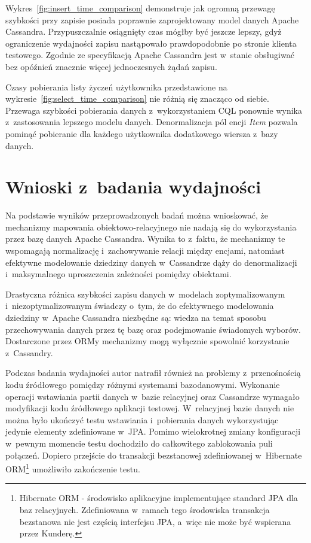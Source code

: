 Wykres~\ref{fig:insert_time_comparison} demonstruje jak ogromną przewagę szybkości przy zapisie posiada poprawnie zaprojektowany model danych Apache Cassandra. Przypuszczalnie osiągnięty czas mógłby być jeszcze lepszy, gdyż ograniczenie wydajności zapisu nastąpowało prawdopodobnie po stronie klienta testowego. Zgodnie ze specyfikacją Apache Cassandra jest w~stanie obsługiwać bez opóźnień znacznie więcej jednoczesnych żądań zapisu.

Czasy pobierania listy życzeń użytkownika przedstawione na wykresie~\ref{fig:select_time_comparison} nie różnią się znacząco od siebie. Przewaga szybkości pobierania danych z~wykorzystaniem CQL ponownie wynika z~zastosowania lepszego modelu danych. Denormalizacja pól encji \emph{Item} pozwala pominąć pobieranie dla każdego użytkownika dodatkowego wiersza z~bazy danych. 

\section{Wnioski z~badania wydajności}
\label{sec:cassandra_orm_performance_summary}

Na podstawie wyników przeprowadzonych badań można wnioskować, że mechanizmy mapowania obiektowo-relacyjnego nie nadają się do wykorzystania przez bazę danych Apache Cassandra. Wynika to z~faktu, że mechanizmy te wspomagają normalizację i~zachowywanie relacji między encjami, natomiast efektywne modelowanie dziedziny danych w~Cassandrze dąży do denormalizacji i~maksymalnego uproszczenia zależności pomiędzy obiektami.

Drastyczna różnica szybkości zapisu danych w~modelach zoptymalizowanym i~niezoptymalizowanym świadczy o~tym, że do efektywnego modelowania dziedziny w~Apache Cassandra niezbędne są: wiedza na temat sposobu przechowywania danych przez tę bazę oraz podejmowanie świadomych wyborów. Dostarczone przez ORMy mechanizmy mogą wyłącznie spowolnić korzystanie z~Cassandry.

Podczas badania wydajności autor natrafił również na problemy z~przenośnością kodu źródłowego pomiędzy różnymi systemami bazodanowymi. Wykonanie operacji wstawiania partii danych w~bazie relacyjnej oraz Cassandrze wymagało modyfikacji kodu źródłowego aplikacji testowej. W~relacyjnej bazie danych nie można było ukończyć testu wstawiania i~pobierania danych wykorzystując jedynie elementy zdefiniowane w~JPA. Pomimo wielokrotnej zmiany konfiguracji w~pewnym momencie testu dochodziło do całkowitego zablokowania puli połączeń. Dopiero przejście do transakcji bezstanowej zdefiniowanej w~Hibernate ORM\footnote{Hibernate ORM - środowisko aplikacyjne implementujące standard JPA dla baz relacyjnych. Zdefiniowana w~ramach tego środowiska transakcja bezstanowa nie jest częścią interfejsu JPA, a~więc nie może być wspierana przez Kunderę.} umożliwiło zakończenie testu.

